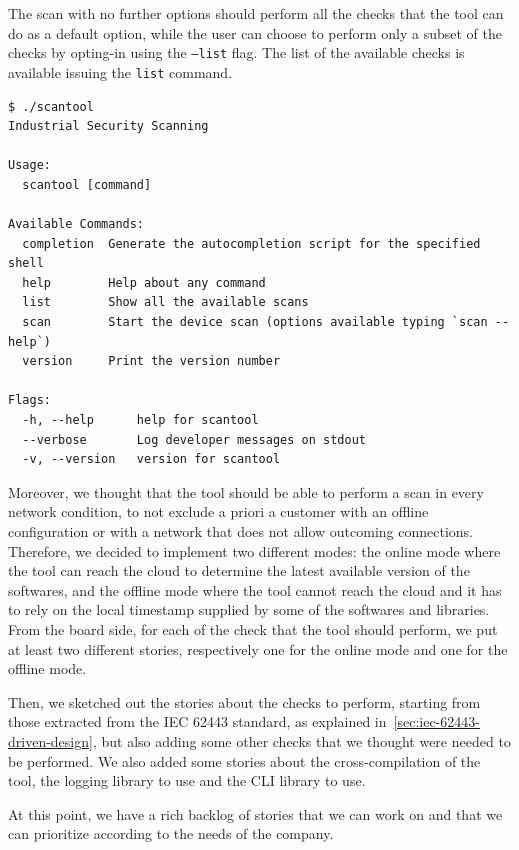 The scan with no further options should perform all the checks that the tool can do as a default option, while the user can choose to perform only a subset of the checks by opting-in using the \texttt{--list} flag. The list of the available checks is available issuing the \texttt{list} command.

\begin{lstlisting}[caption={Man page}]
$ ./scantool
Industrial Security Scanning

Usage:
  scantool [command]

Available Commands:
  completion  Generate the autocompletion script for the specified shell
  help        Help about any command
  list        Show all the available scans
  scan        Start the device scan (options available typing `scan --help`)
  version     Print the version number

Flags:
  -h, --help      help for scantool
  --verbose       Log developer messages on stdout
  -v, --version   version for scantool
\end{lstlisting}

Moreover, we thought that the tool should be able to perform a scan in every network condition, to not exclude a priori a customer with an offline configuration or with a network that does not allow outcoming connections. Therefore, we decided to implement two different modes: the online mode where the tool can reach the cloud to determine the latest available version of the softwares, and the offline mode where the tool cannot reach the cloud and it has to rely on the local timestamp supplied by some of the softwares and libraries. \\
From the board side, for each of the check that the tool should perform, we put at least two different stories, respectively one for the online mode and one for the offline mode.

Then, we sketched out the stories about the checks to perform, starting from those extracted from the IEC 62443 standard, as explained in~\cref{sec:iec-62443-driven-design}, but also adding some other checks that we thought were needed to be performed. We also added some stories about the cross-compilation of the tool, the logging library to use and the CLI library to use.

At this point, we have a rich backlog of stories that we can work on and that we can prioritize according to the needs of the company.

